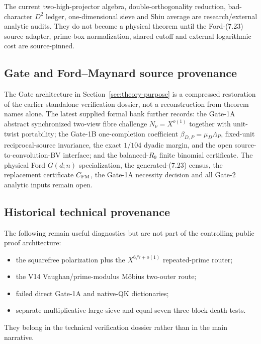 \documentclass[11pt]{article}
\theoremstyle{definition}
\newcommand{\1}{\mathbf 1}
\begin{document}
The current two-high-projector algebra, double-orthogonality reduction, bad-character
$D^2$ ledger, one-dimensional sieve and Shiu average are research/external analytic
audits.  They do not become a physical theorem until the Ford-(7.23) source adapter,
prime-box normalization, shared cutoff and external logarithmic cost are source-pinned.


\subsection*{Gate and Ford--Maynard source provenance}
The Gate architecture in Section~\ref{sec:theory-purpose} is a compressed restoration of the earlier
standalone verification dossier, not a reconstruction from theorem names alone.  The latest supplied formal
bank further records: the Gate-1A abstract synchronized two-view fibre challenge
$N_\nu=X^{o(1)}$ together with unit-twist portability; the Gate-1B one-completion coefficient
$\beta_{D,P}=\mu_D\Lambda_P$, fixed-unit reciprocal-source invariance, the exact $1/104$ dyadic margin,
and the open source-to-convolution-BV interface; and the balanced-$R_9$ finite binomial certificate.
The physical Ford $G(d;n)$ specialization, the generated-(7.23) census, the replacement certificate
$C_{\rm FM}$, the Gate-1A necessity decision and all Gate-2 analytic inputs remain open.

\subsection*{Historical technical provenance}
The following remain useful diagnostics but are not part of the controlling public proof
architecture:
\begin{itemize}[leftmargin=1.6em,itemsep=0.35em]
\item the squarefree polarization plus the $X^{6/7+o(1)}$ repeated-prime router;
\item the V14 Vaughan/prime-modulus M\"obius two-outer route;
\item failed direct Gate-1A and native-QK dictionaries;
\item separate multiplicative-large-sieve and equal-seven three-block death tests.
\end{itemize}
They belong in the technical verification dossier rather than in the main narrative.
\end{document}
